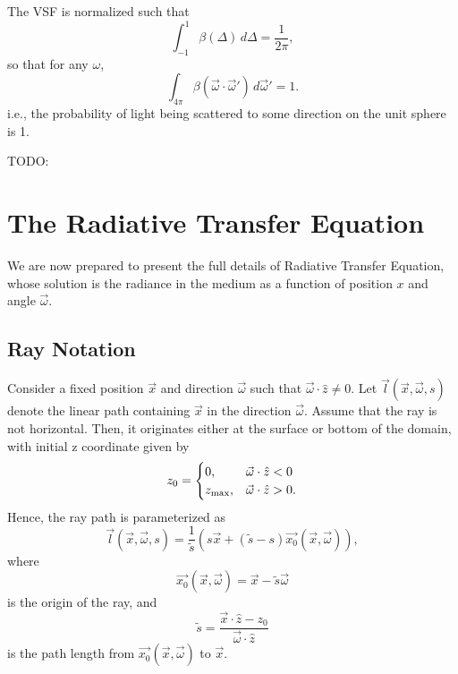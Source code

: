 The VSF is normalized such that
\begin{equation*}
  \int_{-1}^1\beta(\Delta)\, d\Delta=\frac{1}{2\pi},
\end{equation*}
so that for any $\omega$,
\begin{equation*}
  \int_{4\pi}\beta(\vec{\omega}\cdot\vec{\omega}')\, d\vec{\omega}' = 1.
\end{equation*}
i.e., the probability of light being scattered to some direction on the unit sphere is 1.

TODO:
\section{The Radiative Transfer Equation}
We are now prepared to present the full details of Radiative Transfer Equation, whose solution is the radiance in the medium as a function of position $x$ and angle $\vec{\omega}$.

\subsection{Ray Notation}
Consider a fixed position $\vec{x}$ and direction $\vec{\omega}$ such that
$\vec{\omega} \cdot \hat{z} \neq 0$.
Let $\vec{l}(\vec{x}, \vec{\omega}, s)$ denote the linear path containing $\vec{x}$ in the direction $\vec{\omega}$.
Assume that the ray is not horizontal.
Then, it originates either at the surface or bottom of the domain, with initial z coordinate given by
\begin{equation*}
  z_0 =
   \begin{cases}
    0, & \vec{\omega} \cdot \hat{z} < 0 \\
    {z_{\max}}, & \vec{\omega} \cdot \hat{z} > 0.
  \end{cases}
\end{equation*}
Hence, the ray path is parameterized as
\begin{equation}
  \vec{l}(\vec{x}, \vec{\omega}, s) = \frac{1}{\tilde{s}} (s\vec{x} + (\tilde{s} - s)\vec{x_0}(\vec{x}, \vec{\omega})),
  \label{eqn:ray_path}
\end{equation}
where
\begin{equation}
  \vec{x_0}(\vec{x}, \vec{\omega}) = \vec{x} - \tilde{s} \vec{\omega}
  \label{eqn:x_0}
\end{equation}
is the origin of the ray, and
\begin{equation*}
  \tilde{s} = \frac{\vec{x} \cdot \hat{z} - z_0}{\vec{\omega} \cdot \hat{z}}
\end{equation*}
is the path length from $\vec{x_0}(\vec{x}, \vec{\omega})$ to $\vec{x}$.


